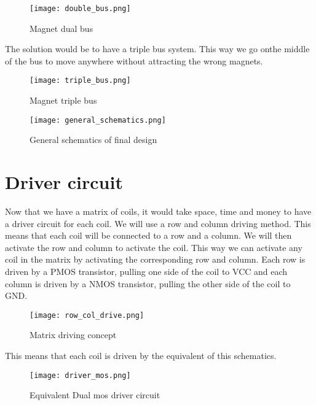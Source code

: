 \begin{figure}[H]
	\centering
	\texttt{[image: double\_bus.png]}
	\caption[Magnet dual bus]{Magnet dual bus}
	\label{fig:double_bus.png}
\end{figure}

\newpage

The solution would be to have a triple bus system. This way we go onthe middle of the bus to move anywhere without attracting the wrong magnets.

\begin{figure}[H]
	\centering
	\texttt{[image: triple\_bus.png]}
	\caption[Magnet triple bus]{Magnet triple bus}
	\label{fig:triple_bus}
\end{figure}


\begin{figure}[H]
	\centering
	\texttt{[image: general\_schematics.png]}
	\caption[General schematics of final design]{General schematics of final design}
	\label{fig:general_schematics}
\end{figure}


\section{Driver circuit}

Now that we have a matrix of coils, it would take space, time and money to have a driver circuit for each coil. We will use a row and column driving method. This means that each coil will be connected to a row and a column. We will then activate the row and column to activate the coil. This way we can activate any coil in the matrix by activating the corresponding row and column. Each row is driven by a PMOS transistor, pulling one side of the coil to VCC and each column is driven by a NMOS transistor, pulling the other side of the coil to GND.

\begin{figure}[H]
	\centering
	\texttt{[image: row\_col\_drive.png]}
	\caption[Matrix driving concept]{Matrix driving concept}
	\label{fig:matrix_concept}
\end{figure}

\newpage

This means that each coil is driven by the equivalent of this schematics.

\begin{figure}[H]
	\centering
	\texttt{[image: driver\_mos.png]}
	\caption[Equivalent Dual mos driver circuit]{Equivalent Dual mos driver circuit}
	\label{fig:driver_mos}
\end{figure}

